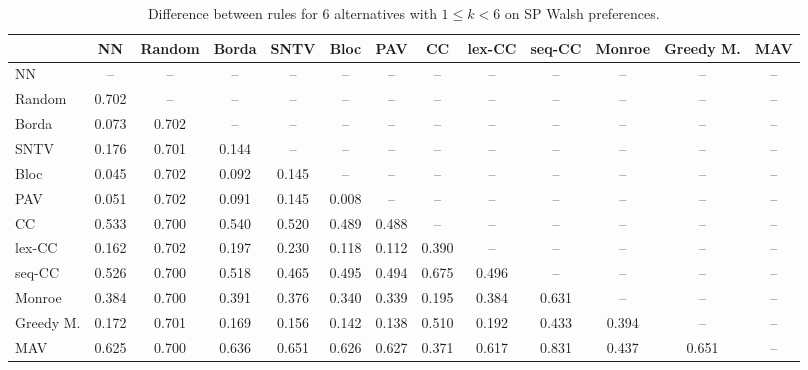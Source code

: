 
\begin{table*}[h!]
\centering
\begin{tabular}{lcccccccccccc}
\toprule
 & NN & Random & Borda & SNTV & Bloc & PAV & CC & lex-CC & seq-CC & Monroe & Greedy M. & MAV \\
\midrule
NN & -- & -- & -- & -- & -- & -- & -- & -- & -- & -- & -- & -- \\
Random & 0.702 & -- & -- & -- & -- & -- & -- & -- & -- & -- & -- & -- \\
Borda & 0.073 & 0.702 & -- & -- & -- & -- & -- & -- & -- & -- & -- & -- \\
SNTV & 0.176 & 0.701 & 0.144 & -- & -- & -- & -- & -- & -- & -- & -- & -- \\
Bloc & 0.045 & 0.702 & 0.092 & 0.145 & -- & -- & -- & -- & -- & -- & -- & -- \\
PAV & 0.051 & 0.702 & 0.091 & 0.145 & 0.008 & -- & -- & -- & -- & -- & -- & -- \\
CC & 0.533 & 0.700 & 0.540 & 0.520 & 0.489 & 0.488 & -- & -- & -- & -- & -- & -- \\
lex-CC & 0.162 & 0.702 & 0.197 & 0.230 & 0.118 & 0.112 & 0.390 & -- & -- & -- & -- & -- \\
seq-CC & 0.526 & 0.700 & 0.518 & 0.465 & 0.495 & 0.494 & 0.675 & 0.496 & -- & -- & -- & -- \\
Monroe & 0.384 & 0.700 & 0.391 & 0.376 & 0.340 & 0.339 & 0.195 & 0.384 & 0.631 & -- & -- & -- \\
Greedy M. & 0.172 & 0.701 & 0.169 & 0.156 & 0.142 & 0.138 & 0.510 & 0.192 & 0.433 & 0.394 & -- & -- \\
MAV & 0.625 & 0.700 & 0.636 & 0.651 & 0.626 & 0.627 & 0.371 & 0.617 & 0.831 & 0.437 & 0.651 & -- \\
\bottomrule
\end{tabular}

\caption{Difference between rules for 6 alternatives with $1 \leq k < 6$ on SP Walsh preferences.}
\end{table*}
